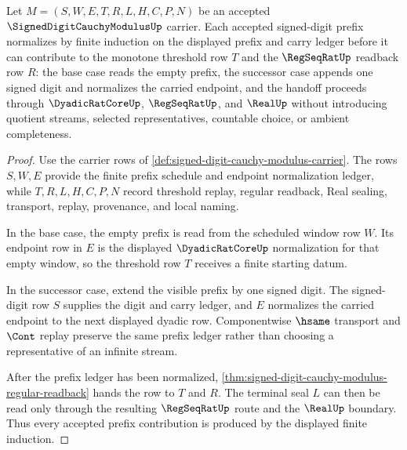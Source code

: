 \begin{theorem}
\label{thm:signed-digit-cauchy-modulus-prefix-induction}
Let $M=(S,W,E,T,R,L,H,C,P,N)$ be an accepted $\SignedDigitCauchyModulusUp$ carrier. Each accepted signed-digit prefix normalizes by finite induction on the displayed prefix and carry ledger before it can contribute to the monotone threshold row $T$ and the $\RegSeqRatUp$ readback row $R$: the base case reads the empty prefix, the successor case appends one signed digit and normalizes the carried endpoint, and the handoff proceeds through $\DyadicRatCoreUp$, $\RegSeqRatUp$, and $\RealUp$ without introducing quotient streams, selected representatives, countable choice, or ambient completeness.
\end{theorem}
\begin{proof}
Use the carrier rows of \autoref{def:signed-digit-cauchy-modulus-carrier}. The rows $S,W,E$ provide the finite prefix schedule and endpoint normalization ledger, while $T,R,L,H,C,P,N$ record threshold replay, regular readback, Real sealing, transport, replay, provenance, and local naming.

In the base case, the empty prefix is read from the scheduled window row $W$. Its endpoint row in $E$ is the displayed $\DyadicRatCoreUp$ normalization for that empty window, so the threshold row $T$ receives a finite starting datum.

In the successor case, extend the visible prefix by one signed digit. The signed-digit row $S$ supplies the digit and carry ledger, and $E$ normalizes the carried endpoint to the next displayed dyadic row. Componentwise $\hsame$ transport and $\Cont$ replay preserve the same prefix ledger rather than choosing a representative of an infinite stream.

After the prefix ledger has been normalized, \autoref{thm:signed-digit-cauchy-modulus-regular-readback} hands the row to $T$ and $R$. The terminal seal $L$ can then be read only through the resulting $\RegSeqRatUp$ route and the $\RealUp$ boundary. Thus every accepted prefix contribution is produced by the displayed finite induction.
\end{proof}

